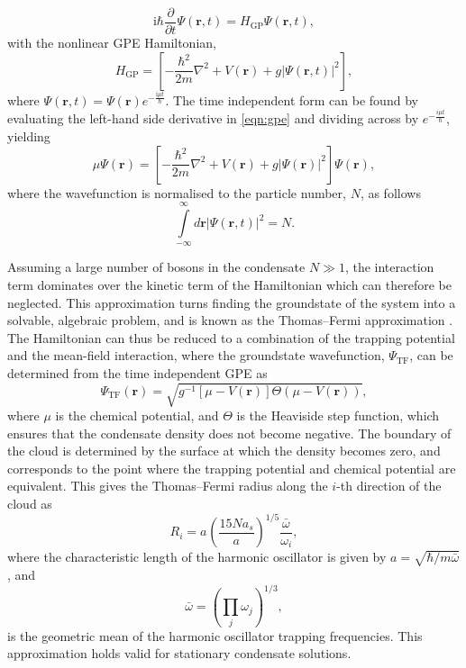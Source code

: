 \begin{equation}\label{eqn:gpe}
\textrm{i}\hbar\frac{\partial}{\partial t}\Psi(\mathbf{r},t) = H_{\textrm{GP}} \Psi(\textbf{r},t),
\end{equation}
with the nonlinear GPE Hamiltonian,
\begin{equation}\label{eqn:h_gp}
H_{\textrm{GP}} = \left[-\frac{\hbar^2}{2m}\nabla^2 + V(\textbf{r}) + g\vert\Psi(\mathbf{r},t)\vert^2 \right],
\end{equation}
where $\Psi(\textbf{r},t) = \Psi(\textbf{r})e^{-\frac{\textrm{i}\mu t}{\hbar}}$.
 The time independent form can be found by evaluating the left-hand side derivative in \eqref{eqn:gpe} and dividing across by $e^{-\frac{i\mu t}{\hbar}}$, yielding
\begin{equation}
\mu\Psi(\mathbf{r}) = \left[-\frac{\hbar^2}{2m}\nabla^2 + V(\mathbf{r}) + g\vert\Psi(\mathbf{r})\vert^2 \right]\Psi(\mathbf{r}),
\end{equation}
where the wavefunction is normalised to the particle number, $N$, as follows
\begin{equation}\label{eqn:norm}
\displaystyle\int\limits_{-\infty}^{\infty}d\mathbf{r} \left\vert \Psi\left(\mathbf{r},t\right) \right\vert^2 = N.
\end{equation}

Assuming a large number of bosons in the condensate $N\gg 1$, the interaction term dominates over the kinetic term of the Hamiltonian which can therefore be neglected. This approximation turns finding the groundstate of the system into a solvable, algebraic problem, and is known as the Thomas--Fermi approximation \cite[~p. 84]{BK:Ueda_2010}. The Hamiltonian can thus be reduced to a combination of the trapping potential and the mean-field interaction, where the groundstate wavefunction, $\Psi_{\textrm{TF}}$, can be determined from the time independent GPE as
\begin{equation}
\Psi_{\textrm{TF}}(\mathbf{r}) = \sqrt{ g^{-1}[\mu - V(\textbf{r})] \Theta(\mu - V(\textbf{r}))},
\end{equation}
where $\mu$ is the chemical potential, and $\Theta$ is the Heaviside step function, which ensures that the condensate density does not become negative. The boundary of the cloud is determined by the surface at which the density becomes zero, and corresponds to the point where the trapping potential and chemical potential are equivalent. This gives the Thomas--Fermi radius along the $i$-th direction of the cloud \cite[~p. 165]{BK:Pethick_Smith_2008} as
\begin{equation}
{R}_i = a_{\textrm{}}\left(\frac{15Na_s}{a_{\textrm{}}}\right)^{1/5}\frac{\bar{\omega}_{\textrm{}}}{\omega_i},
\end{equation}
where the characteristic length of the harmonic oscillator is given by
${a} = \sqrt{{\hbar}/{m\bar{\omega}}}$, and \[\bar{\omega} = \left(\displaystyle\prod\limits_j \omega_j\right)^{1/3},\] is the geometric mean of the harmonic oscillator trapping frequencies. This approximation holds valid for stationary condensate solutions.

